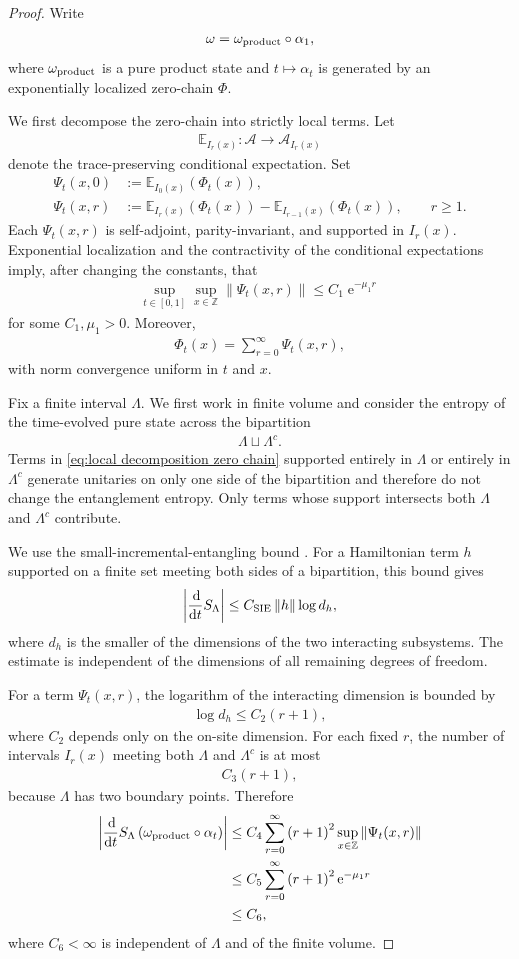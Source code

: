 \documentclass[a4paper,10pt]{article}
\numberwithin{equation}{section}
\theoremstyle{plain}
\theoremstyle{plain}
\theoremstyle{plain}
\theoremstyle{plain}
\theoremstyle{plain}
\theoremstyle{remark}
\theoremstyle{definition}
\newcommand{\ee}{\operatorname{e}}
\newcommand{\ZZ}{\mathbb{Z}}
\newcommand{\calA}{\mathcal{A}}
\newcommand\norm[1]{\left\lVert#1\right\rVert}
\newcommand{\dif}{\operatorname{d}\!} %
\newcommand{\eq}[1]{\begin{align*}#1\end{align*}}
\newcommand{\eql}[1]{\begin{align}#1\end{align}}
\newcommand{\br}[1]{\left(#1\right)}
\begin{document}
\begin{proof}
Write
\eq{
    \omega
    =
    \omega_{\rm product}\circ\alpha_1,
}
where $\omega_{\rm product}$ is a pure product state and
$t\mapsto\alpha_t$ is generated by an exponentially localized
zero-chain $\Phi$.

We first decompose the zero-chain into strictly local terms. Let
\eq{
    \mathbb E_{I_r(x)}
    :
    \calA
    \longrightarrow
    \calA_{I_r(x)}
}
denote the trace-preserving conditional expectation. Set
\eq{
    \Psi_t(x,0)
    &:=
    \mathbb E_{I_0(x)}
    \br{
        \Phi_t(x)
    },\\
    \Psi_t(x,r)
    &:=
    \mathbb E_{I_r(x)}
    \br{
        \Phi_t(x)
    }
    -
    \mathbb E_{I_{r-1}(x)}
    \br{
        \Phi_t(x)
    },
    \qquad
    r\geq1.
}
Each $\Psi_t(x,r)$ is self-adjoint, parity-invariant, and supported in
$I_r(x)$. Exponential localization and the contractivity of the
conditional expectations imply, after changing the constants, that
\eq{
    \sup_{t\in[0,1]}
    \sup_{x\in\ZZ}
    \norm{
        \Psi_t(x,r)
    }
    \leq
    C_1\ee^{-\mu_1r}
}
for some $C_1,\mu_1>0$. Moreover,
\eql{\label{eq:local decomposition zero chain}
    \Phi_t(x)
    =
    \sum_{r=0}^{\infty}
    \Psi_t(x,r),
}
with norm convergence uniform in $t$ and $x$.

Fix a finite interval $\Lambda$. We first work in finite volume and
consider the entropy of the time-evolved pure state across the
bipartition
\eq{
    \Lambda
    \sqcup
    \Lambda^c.
}
Terms in \cref{eq:local decomposition zero chain} supported entirely in
$\Lambda$ or entirely in $\Lambda^c$ generate unitaries on only one side
of the bipartition and therefore do not change the entanglement entropy.
Only terms whose support intersects both $\Lambda$ and $\Lambda^c$
contribute.

We use the small-incremental-entangling bound
\cite[Theorem~3]{MarienAudenaertVanAcoleyenVerstraete2016AreaLaw}.
For a Hamiltonian term $h$ supported on a finite set meeting both sides
of a bipartition, this bound gives
\eq{
    \left|
        \frac{\dif}{\dif t}S_\Lambda
    \right|
    \leq
    C_{\rm SIE}
    \norm{h}
    \log d_h,
}
where $d_h$ is the smaller of the dimensions of the two interacting
subsystems. The estimate is independent of the dimensions of all
remaining degrees of freedom.

For a term $\Psi_t(x,r)$, the logarithm of the interacting dimension is
bounded by
\eq{
    \log d_h
    \leq
    C_2\br{r+1},
}
where $C_2$ depends only on the on-site dimension. For each fixed $r$,
the number of intervals $I_r(x)$ meeting both $\Lambda$ and
$\Lambda^c$ is at most
\eq{
    C_3\br{r+1},
}
because $\Lambda$ has two boundary points. Therefore
\eq{
    \left|
        \frac{\dif}{\dif t}
        S_\Lambda
        \br{
            \omega_{\rm product}\circ\alpha_t
        }
    \right|
    &\leq
    C_4
    \sum_{r=0}^{\infty}
    \br{r+1}^2
    \sup_{x\in\ZZ}
    \norm{
        \Psi_t(x,r)
    }\\
    &\leq
    C_5
    \sum_{r=0}^{\infty}
    \br{r+1}^2
    \ee^{-\mu_1r}\\
    &\leq
    C_6,
}
where $C_6<\infty$ is independent of $\Lambda$ and of the finite volume.


\end{proof}
\end{document}
